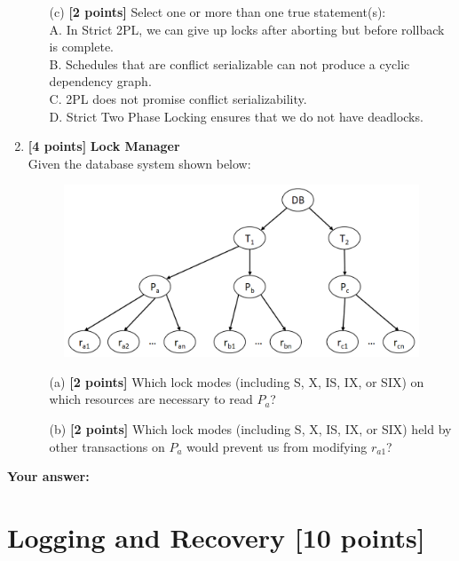 \documentclass[10pt]{article}
\begin{document}
\begin{enumerate}
\begin{itemize}
		      \item[(c)] \textbf{[2 points]} Select one or more than one true statement(s): \\
		            A. In Strict 2PL, we can give up locks after aborting but before rollback
		            is complete. \\
		            B. Schedules that are conflict serializable can not produce a cyclic
		            dependency graph. \\
		            C. 2PL does not promise conflict serializability. \\
		            D. Strict Two Phase Locking ensures that we do not have deadlocks. \\

	      \end{itemize}

	\item \textbf{[4 points]} \textbf{Lock Manager} \\
	      Given the database system shown below:
	      \begin{figure}[ht]
		      \centering
		      \includegraphics[width=0.7\linewidth]{lock_mode}
	      \end{figure}
	      \begin{itemize}
		      \item[(a)] \textbf{[2 points]} Which lock modes (including S, X, IS, IX, or SIX) on which resources are necessary to read $P_a$? \\
		      \item[(b)] \textbf{[2 points]} Which lock modes (including S, X, IS, IX, or SIX) held by other transactions on $P_a$ would prevent us from modifying $r_{a1}$? \\
	      \end{itemize}

\end{enumerate}
\textbf{Your answer:}


\newpage
\section{Logging and Recovery \textbf{[10 points]}}
\end{document}
